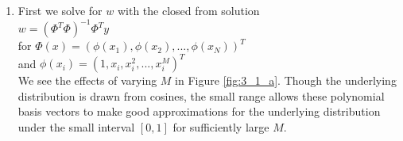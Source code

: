 \documentclass[1pt]{article}
\begin{document}
\begin{enumerate}[label=\alph*.)]
\item First we solve for $w$ with the closed from solution  \\
$w = (\Phi^T\Phi)^{-1} \Phi^T y$\\
for $\Phi(x) = (\phi(x_1), \phi(x_2), ..., \phi(x_N))^T$\\
and $\phi(x_i) = (1, x_i, x_i^2, ..., x_i^M)^T$\\
We see the effects of varying $M$ in Figure \ref{fig:3_1_a}. Though the underlying distribution is drawn from cosines, the small range allows these polynomial basis vectors to make good approximations for the underlying distribution under the small interval $[0, 1]$ for sufficiently large $M$.\\




\end{enumerate}
\end{document}
